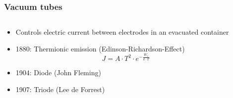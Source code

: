\documentclass{beamer}
\begin{document}
\begin{frame}\frametitle{Vacuum tubes} 
\begin{columns}
\begin{column}{7cm}
\begin{itemize}
\item<1-> Controls electric current between electrodes in an evacuated container
\item<2-> 1880: Thermionic emission (Edinson-Richardson-Effect)
\begin{equation*} 
J=A\cdot T^2 \cdot e^{-\frac{W_e}{k \cdot T}}
\end{equation*}
\item<3-> 1904: Diode (John Fleming)
\item<4-> 1907: Triode (Lee de Forrest) 
\end{itemize}
\end{column}
\begin{column}{4cm}
\begin{overprint}
%

\end{overprint}
\end{column}
\end{columns}
\end{frame}
\end{document}
